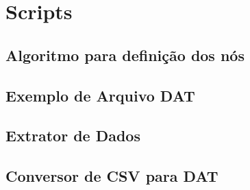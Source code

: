 \chapter[Scripts]{Scripts}
\label{scripts}

\lstset{style=}
\section{Algoritmo para definição dos nós}
\label{apendice:Algoritmo_nos.txt}


\lstset{style=code}
\section{Exemplo de Arquivo DAT}
\label{apendice:exemplo.dat}


\section{Extrator de Dados} 
\label{apendice:extrator}


\section{Conversor de CSV para DAT} 
\label{apendice:conversor}


